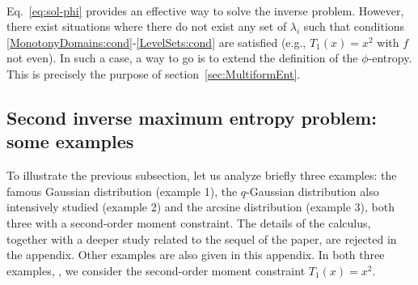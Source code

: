 \documentclass[english,sort&compress]{elsarticle}
\theoremstyle{definition}
\theoremstyle{plain}
\theoremstyle{plain}
\begin{document}
\

Eq.~\eqref{eq:sol-phi} provides an effective way to solve the inverse
problem. However, there exist situations where there do not exist any set of
$\lambda_i$ such that conditions \ref{MonotonyDomains:cond}-\ref{LevelSets:cond}
are satisfied (e.g., $T_1(x) = x^2$ with $f$ not even). In such a case, a way to go is to extend the definition of the $\phi$-entropy. This is precisely the purpose of section~\ref{sec:MultiformEnt}.




\subsection{Second inverse maximum entropy problem: some examples}

To illustrate the previous subsection, let us analyze briefly three
examples: the famous Gaussian distribution (example 1), the $q$-Gaussian
distribution also intensively studied (example 2) and the arcsine distribution
(example 3), both three with a second-order moment constraint.  The details of the calculus, together with a deeper
study related to the sequel of the paper, are rejected in the appendix. Other
examples are also given in this appendix. In both three examples, , we consider the second-order moment constraint $T_1(x) =
x^2$.

\end{document}
